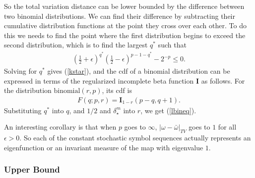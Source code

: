 So the total variation distance can be lower bounded by the difference between two binomial
distributions. We can find their difference by subtracting their cumulative distribution functions
at the point they cross over each other. To do this we needs to find the point where the first
distribution begins to exceed the second distribution, which is to find the largest $q^*$ such that
\begin{eqnarray}
\left(\frac{1}{2}+\epsilon\right)^{q^*}\left(\frac{1}{2}-\epsilon\right)^{p-1-q^*}-2^{-p} \le 0.
\end{eqnarray}
Solving for $q^*$ gives (\ref{kstar}), and the cdf of a binomial distribution can be expressed in terms
of the regularized incomplete beta function $\mathbf{I}$ as follows. For the distribution
$\text{binomial}(r,p)$, its cdf is
\begin{eqnarray}
   F(q;p,r) = \mathbf{I}_{1-r}(p-q,q+1).
\end{eqnarray}
Substituting $q^*$ into $q$, and $1/2$ and $\delta^m_\star$ into $r$, we get (\ref{lbineq}).


An interesting corollary is that when $p$ goes to $\infty$, $|\omega-\bar{\omega}|_{TV}$ goes
to $1$ for all $\epsilon>0$. So each of the constant stochastic symbol sequences actually
represents an eigenfunction or an invariant measure of the map with eigenvalue $1$.




\subsubsection{Upper Bound}

